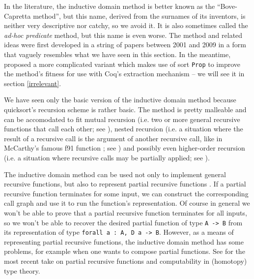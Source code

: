 \documentclass[declaration,mgr,english,shortabstract]{iithesis}
\newcommand{\m}[1]{\texttt{#1}}
\begin{document}
In the literature, the inductive domain method is better known as the ``Bove-Capretta method'', but this name, derived from the surnames of its inventors, is neither very descriptive nor catchy, so we avoid it. It is also sometimes called the \textit{ad-hoc predicate} method, but this name is even worse. The method and related ideas were first developed in a string of papers between 2001 and 2009 \cite{BCM1} \cite{BCM2} \cite{BCM3} \cite{BCM4} \cite{BCM5} \cite{BCM6} \cite{BCM7} \cite{BCM8} \cite{BCM9} in a form that vaguely resembles what we have seen in this section. In the meantime, \cite{CoqArt} proposed a more complicated variant which makes use of sort \m{Prop} to improve the method's fitness for use with Coq's extraction mechanism -- we will see it in section \ref{irrelevant}.

We have seen only the basic version of the inductive domain method because quicksort's recursion scheme is rather basic. The method is pretty malleable and can be accomodated to fit mutual recursion (i.e. two or more general recursive functions that call each other; see \cite{BCM3}), nested recursion (i.e. a situation where the result of a recursive call is the argument of another recursive call, like in McCarthy's famous f91 function \cite{f91}; see \cite{BCM2}) and possibly even higher-order recursion (i.e. a situation where recursive calls may be partially applied; see \cite{BCM6}).

The inductive domain method can be used not only to implement general recursive functions, but also to represent partial recursive functions \cite{BCM8}. If a partial recursive function terminates for some input, we can construct the corresponding call graph and use it to run the function's representation. Of course in general we won't be able to prove that a partial recursive function terminates for all inputs, so we won't be able to recover the desired partial function of type \m{A -> B} from its representation of type \m{forall a\ :\ A, D a -> B}. However, as a means of representing partial recursive functions, the inductive domain method has some problems, for example when one wants to compose partial functions. See \cite{Knapp} for the most recent take on partial recursive functions and computability in (homotopy) type theory.
\end{document}
